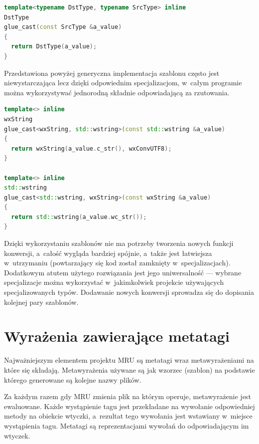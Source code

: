 \begin{lstlisting}[caption={ glue.hpp}, language=C++]
template<typename DstType, typename SrcType> inline
DstType
glue_cast(const SrcType &a_value)
{
  return DstType(a_value);
}
\end{lstlisting}

\par
Przedstawiona powyżej generyczna implementacja szablonu często jest niewystarczająca lecz dzięki odpowiednim specjalizacjom, w~całym programie można wykorzystywać jednorodną składnie odpowiadającą za rzutowania.

\begin{lstlisting}[caption={ Fragment glue\_impl.hpp --- specjalizacja dla std::wstring i~wxString}, language=C++]
template<> inline
wxString
glue_cast<wxString, std::wstring>(const std::wstring &a_value)
{
  return wxString(a_value.c_str(), wxConvUTF8);
}

template<> inline
std::wstring
glue_cast<std::wstring, wxString>(const wxString &a_value)
{
  return std::wstring(a_value.wc_str());
}

\end{lstlisting}

\par
Dzięki wykorzystaniu szablonów nie ma potrzeby tworzenia nowych funkcji konwersji, a~całość wygląda bardziej spójnie, a~także jest łatwiejsza w~utrzymaniu (powtarzający się kod został zamknięty w~specjalizacjach). Dodatkowym atutem użytego rozwiązania jest jego uniwersalność --- wybrane specjalizacje można wykorzystać w~jakimkolwiek projekcie używających specjalizowanych typów. Dodawanie nowych konwersji sprowadza się do dopisania kolejnej pary szablonów.

\section{Wyrażenia zawierające metatagi}
Najważniejszym elementem projektu MRU są metatagi wraz metawyrażeniami na które się składają.
Metawyrażenia używane są jak wzorzec (szablon) na podstawie którego generowane są kolejne nazwy plików.

\par
Za każdym razem gdy MRU zmienia plik na którym operuje, metawyrażenie jest ewaluowane. Każde wystąpienie tagu jest przekładane na wywołanie odpowiedniej metody na obiekcie wtyczki, a~rezultat tego wywołania jest wstawiany w~miejsce wystąpienia tagu.
Metatagi są reprezentacjami wywołań do odpowiadającym im wtyczek.

